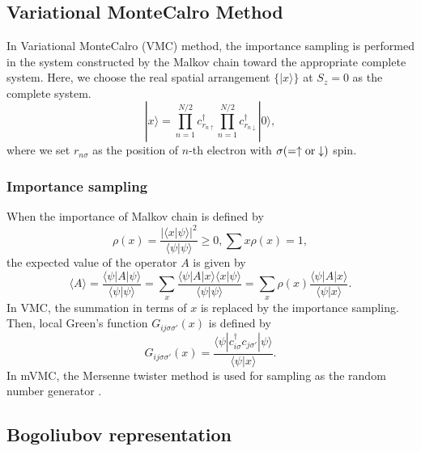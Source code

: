 \chapter{}
\label{Ch:algorithm}
\section{Variational MonteCalro Method}
In Variational MonteCalro (VMC) method, the importance sampling is performed in the system constructed by the Malkov chain toward the appropriate complete system.
Here, we choose the real spatial arrangement $\{| x\rangle\}$ at $S_z = 0$ as the complete system.
\begin{equation}
| x\rangle =  \prod_{n=1}^{N/2} c_{r_{n\uparrow}}^{\dag} \prod_{n=1}^{N/2} c_{r_{n\downarrow}}^{\dag} |0 \rangle,
\end{equation}
where we set $r_{n\sigma}$ as the position of $n$-th electron with $\sigma (=\uparrow \rm{or} \downarrow)$ spin.

\subsection{Importance sampling}
When the importance of Malkov chain is defined by
\begin{equation}
\rho(x)=\frac{|\langle x| \psi \rangle|^2}{\langle \psi | \psi \rangle} \ge 0, \sum{x} \rho(x)=1,
\end{equation}
the expected value of the operator $A$ is given by
\begin{equation}
\langle A \rangle =\frac{\langle \psi| A| \psi \rangle}{\langle \psi | \psi \rangle} 
=\sum_x \frac{\langle \psi| A | x\rangle \langle x| \psi \rangle}{\langle \psi |\psi \rangle} 
=\sum_x \rho(x) \frac{\langle \psi| A | x\rangle }{\langle \psi |x \rangle} .
\end{equation}
In VMC, the summation in terms of $x$ is replaced by the importance sampling.
Then, local Green's function $G_{ij\sigma\sigma'}(x)$ is defined by
\begin{equation}
G_{ij\sigma\sigma'}(x)=\frac{\langle \psi | c_{i\sigma}^{\dag} c_{j\sigma'} | \psi \rangle}{\langle \psi | x \rangle}.
\end{equation}
In mVMC, the Mersenne twister method is used for sampling as the random number generator \cite{Mutsuo2008}. 

\section{Bogoliubov representation}\label{sec_bogoliubov_rep}

